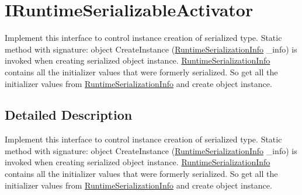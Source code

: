 \hypertarget{interface_voxel_busters_1_1_runtime_serialization_1_1_i_runtime_serializable_activator}{}\section{I\+Runtime\+Serializable\+Activator}
\label{interface_voxel_busters_1_1_runtime_serialization_1_1_i_runtime_serializable_activator}


Implement this interface to control instance creation of serialized type. Static method with signature\+: object Create\+Instance (\hyperlink{class_voxel_busters_1_1_runtime_serialization_1_1_runtime_serialization_info}{Runtime\+Serialization\+Info} \+\_\+info) is invoked when creating serialized object instance. \hyperlink{class_voxel_busters_1_1_runtime_serialization_1_1_runtime_serialization_info}{Runtime\+Serialization\+Info} contains all the initializer values that were formerly serialized. So get all the initializer values from \hyperlink{class_voxel_busters_1_1_runtime_serialization_1_1_runtime_serialization_info}{Runtime\+Serialization\+Info} and create object instance.  




\subsection{Detailed Description}
Implement this interface to control instance creation of serialized type. Static method with signature\+: object Create\+Instance (\hyperlink{class_voxel_busters_1_1_runtime_serialization_1_1_runtime_serialization_info}{Runtime\+Serialization\+Info} \+\_\+info) is invoked when creating serialized object instance. \hyperlink{class_voxel_busters_1_1_runtime_serialization_1_1_runtime_serialization_info}{Runtime\+Serialization\+Info} contains all the initializer values that were formerly serialized. So get all the initializer values from \hyperlink{class_voxel_busters_1_1_runtime_serialization_1_1_runtime_serialization_info}{Runtime\+Serialization\+Info} and create object instance. 

